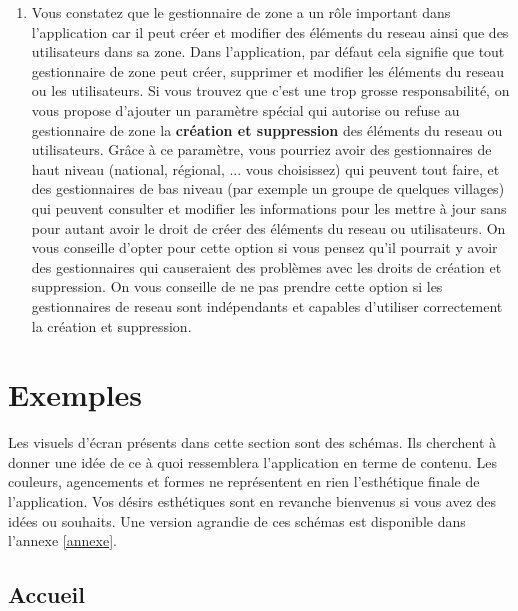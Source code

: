 \documentclass[a4paper, 11pt]{article}
\begin{document}
\begin{mdframed}[style=HighlightQuestion]
\begin{enumerate}
      \item Vous constatez que le gestionnaire de \gls{zone} a un rôle important dans l'\gls{application} car il peut créer et modifier des éléments du \gls{reseau} ainsi que des \glspl{utilisateur} dans sa \gls{zone}. Dans l'\gls{application}, par défaut cela signifie que tout gestionnaire de \gls{zone} peut créer, supprimer et modifier les éléments du \gls{reseau} ou les \glspl{utilisateur}. Si vous trouvez que c'est une trop grosse responsabilité, on vous propose d'ajouter un paramètre spécial qui autorise ou refuse au gestionnaire de \gls{zone} la \textbf{création et suppression} des éléments du \gls{reseau} ou \glspl{utilisateur}. Grâce à ce paramètre, vous pourriez avoir des gestionnaires de haut niveau (national, régional, ... vous choisissez) qui peuvent tout faire, et des gestionnaires de bas niveau (par exemple un groupe de quelques villages) qui peuvent consulter et modifier les informations pour les mettre à jour sans pour autant avoir le droit de créer des éléments du \gls{reseau} ou \glspl{utilisateur}. On vous conseille d'opter pour cette option si vous pensez qu'il pourrait y avoir des gestionnaires qui causeraient des problèmes avec les droits de création et suppression. On vous conseille de ne pas prendre cette option si les gestionnaires de \gls{reseau} sont indépendants et capables d'utiliser correctement la création et suppression.
    \end{enumerate}
  \end{mdframed}

\section{Exemples}
  \begin{shaded}
    Les visuels d'écran présents dans cette section sont des schémas. Ils cherchent à donner une idée de ce à quoi ressemblera l'\gls{application} en terme de contenu. Les couleurs, agencements et formes ne représentent en rien l'esthétique finale de l'\gls{application}. Vos désirs esthétiques sont en revanche bienvenus si vous avez des idées ou souhaits. Une version agrandie de ces schémas est disponible dans l'annexe \ref{annexe}.
  \end{shaded}

  \subsection{Accueil}
\end{document}
